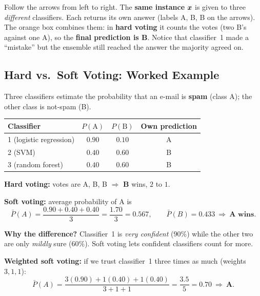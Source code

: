 \begin{explain}
Follow the arrows from left to right. The \textbf{same instance} $\boldsymbol{x}$ is given to three \emph{different} classifiers. Each returns its own answer (labels A, B, B on the arrows). The orange box combines them: in \textbf{hard voting} it counts the votes (two B's against one A), so the \textbf{final prediction is B}. Notice that classifier~1 made a ``mistake'' but the ensemble still reached the answer the majority agreed on.
\end{explain}

\subsection{Hard vs.\ Soft Voting: Worked Example}

\begin{example}
Three classifiers estimate the probability that an e-mail is \textbf{spam} (class A); the other class is not-spam (B).

\medskip
\begin{center}
\begin{tabular}{@{}lccc@{}}
\toprule
\textbf{Classifier} & $P(\text{A})$ & $P(\text{B})$ & \textbf{Own prediction}\\
\midrule
1 (logistic regression) & $0.90$ & $0.10$ & A\\
2 (SVM) & $0.40$ & $0.60$ & B\\
3 (random forest) & $0.40$ & $0.60$ & B\\
\bottomrule
\end{tabular}
\end{center}

\medskip
\textbf{Hard voting:} votes are A, B, B $\Rightarrow$ \textbf{B} wins, $2$ to $1$.

\medskip
\textbf{Soft voting:} average probability of A is
\[
  \bar P(A)=\frac{0.90+0.40+0.40}{3}=\frac{1.70}{3}=0.567,\qquad
  \bar P(B)=0.433\ \Rightarrow\ \textbf{A wins}.
\]

\textbf{Why the difference?} Classifier~1 is \emph{very confident} ($90\%$) while the other two are only \emph{mildly} sure ($60\%$). Soft voting lets confident classifiers count for more.

\medskip
\textbf{Weighted soft voting:} if we trust classifier~1 three times as much (weights $3,1,1$):
\[
  \bar P(A)=\frac{3(0.90)+1(0.40)+1(0.40)}{3+1+1}=\frac{3.5}{5}=0.70\ \Rightarrow\ \textbf{A}.
\]
\end{example}


